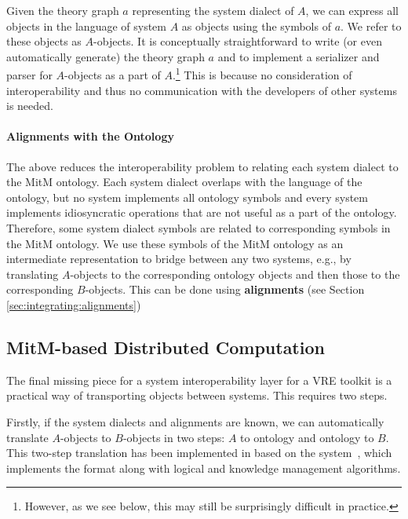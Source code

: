 Given the theory graph $a$ representing the system dialect of $A$, we can express all objects in the language of system $A$ as \OMMT objects using the symbols of $a$.
We refer to these objects as $A$-objects.
It is conceptually straightforward to write (or even automatically generate) the theory graph $a$ and to implement a serializer and parser for $A$-objects as a part of $A$.\footnote{However, as we see below, this may still be surprisingly difficult in practice.}
This is because no consideration of interoperability and thus no communication with the developers of other systems is needed.


\paragraph{Alignments with the Ontology}
The above reduces the interoperability problem to relating each system dialect to the MitM ontology.
Each system dialect overlaps with the language of the ontology, but no system implements all ontology symbols and every system implements idiosyncratic operations that are not useful as a part of the ontology.
Therefore, some system dialect symbols are related to corresponding symbols in the MitM ontology.
We use these symbols of the MitM ontology as an intermediate representation to bridge between any two systems, e.g., by translating $A$-objects to the corresponding ontology objects and then those to the corresponding $B$-objects. This can be done using \OMMT \textbf{alignments} (see Section \ref{sec:integrating:alignments})

\subsection{MitM-based Distributed Computation}\label{sec:mitm:comms}

The final missing piece for a system interoperability layer for a VRE toolkit is a practical way of transporting objects between systems.
This requires two steps.

Firstly, if the system dialects and alignments are known, we can automatically translate $A$-objects to $B$-objects in two steps: $A$ to ontology and ontology to $B$.
This two-step translation has been implemented in \cite{MueRoYuRa:abtafs17} based on the \MMT system~\cite{Rabe:MAGMS13,uniformal:on}, which implements the \OMMT format along with logical and knowledge management algorithms.

